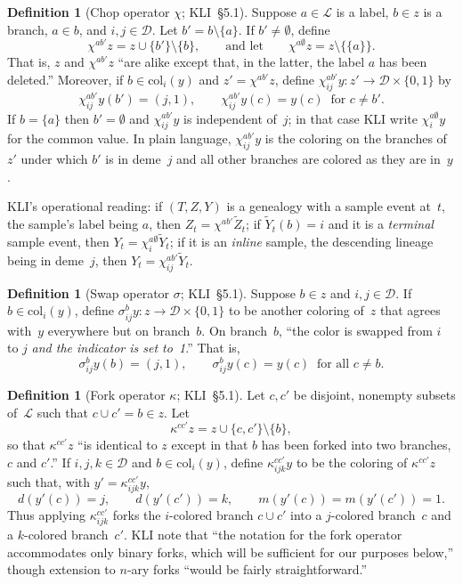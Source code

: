 \documentclass[11pt,leqno]{article}
\newcommand{\Demes}{\mathcal{D}}    %
\theoremstyle{plain}
\theoremstyle{definition}
\newtheorem{definition}[theorem]{Definition}
\begin{document}
\begin{definition}[Chop operator $\chi$; KLI~\S5.1]
\label{def:chop}
Suppose $a \in \mathcal{L}$ is a label, $b \in z$ is a branch,
$a \in b$, and $i, j \in \Demes$.  Let $b' = b \setminus \{a\}$.
If $b' \ne \emptyset$, define
\[
  \chi^{ab'} z = z \cup \{b'\} \setminus \{b\},
  \qquad\text{and let}\qquad
  \chi^{a\emptyset} z = z \setminus \{\{a\}\}.
\]
That is, $z$ and $\chi^{ab'} z$ ``are alike except that, in the
latter, the label $a$ has been deleted.''  Moreover, if
$b \in \mathrm{col}_i(y)$ and $z' = \chi^{ab'} z$, define
$\chi^{ab'}_{ij} y : z' \to \Demes \times \{0,1\}$ by
\[
  \chi^{ab'}_{ij} y (b') = (j, 1),
  \qquad
  \chi^{ab'}_{ij} y (c) = y(c) \ \text{ for } c \ne b'.
\]
If $b = \{a\}$ then $b' = \emptyset$ and $\chi^{ab'}_{ij} y$ is
independent of~$j$; in that case KLI write $\chi^{a\emptyset}_{i} y$
for the common value.  In plain language, $\chi^{ab'}_{ij} y$ is the
coloring on the branches of~$z'$ under which $b'$ is in deme~$j$ and
all other branches are colored as they are in~$y$.
\end{definition}

KLI's operational reading: if $(T, Z, Y)$ is a genealogy with a sample
event at~$t$, the sample's label being $a$, then
$Z_t = \chi^{ab'} \tilde{Z}_t$; if $\tilde{Y}_t(b) = i$ and it is a
\emph{terminal} sample event, then $Y_t = \chi^{a\emptyset}_{i}
\tilde{Y}_t$; if it is an \emph{inline} sample, the descending lineage
being in deme~$j$, then $Y_t = \chi^{ab'}_{ij} \tilde{Y}_t$.

\begin{definition}[Swap operator $\sigma$; KLI~\S5.1]
\label{def:swap}
Suppose $b \in z$ and $i, j \in \Demes$.  If
$b \in \mathrm{col}_i(y)$, define
$\sigma^{b}_{ij} y : z \to \Demes \times \{0,1\}$ to be another
coloring of~$z$ that agrees with~$y$ everywhere but on branch~$b$.
On branch~$b$, ``the color is swapped from $i$ to $j$ \emph{and the
indicator is set to~1}.''  That is,
\[
  \sigma^{b}_{ij} y (b) = (j, 1),
  \qquad
  \sigma^{b}_{ij} y (c) = y(c) \ \text{ for all } c \ne b.
\]
\end{definition}

\begin{definition}[Fork operator $\kappa$; KLI~\S5.1]
\label{def:fork}
Let $c, c'$ be disjoint, nonempty subsets of~$\mathcal{L}$ such that
$c \cup c' = b \in z$.  Let
\[
  \kappa^{cc'} z = z \cup \{c, c'\} \setminus \{b\},
\]
so that $\kappa^{cc'} z$ ``is identical to $z$ except in that $b$ has
been forked into two branches, $c$ and $c'$.''  If
$i, j, k \in \Demes$ and $b \in \mathrm{col}_i(y)$, define
$\kappa^{cc'}_{ijk} y$ to be the coloring of $\kappa^{cc'} z$ such
that, with $y' = \kappa^{cc'}_{ijk} y$,
\[
  d(y'(c)) = j, \qquad d(y'(c')) = k, \qquad
  m(y'(c)) = m(y'(c')) = 1.
\]
Thus applying $\kappa^{cc'}_{ijk}$ forks the $i$-colored branch
$c \cup c'$ into a $j$-colored branch~$c$ and a $k$-colored
branch~$c'$.  KLI note that ``the notation for the fork operator
accommodates only binary forks, which will be sufficient for our
purposes below,'' though extension to $n$-ary forks ``would be fairly
straightforward.''
\end{definition}
\end{document}
